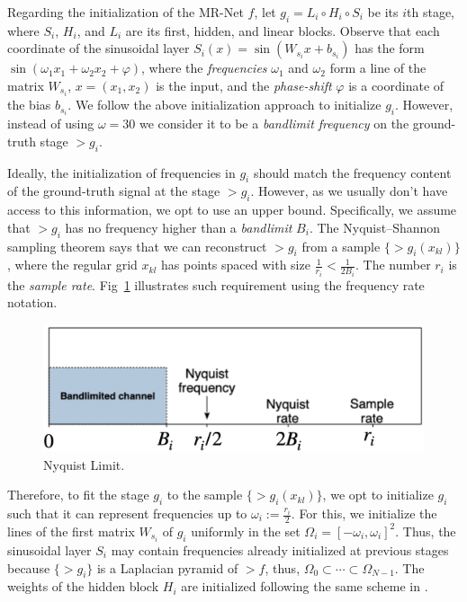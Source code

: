 Regarding the initialization of the MR-Net $f$, let $g_i=L_i\circ H_i\circ S_i$ be its $i$th stage, where $S_i$, $H_i$, and $L_i$ are its first, hidden, and linear blocks.
Observe that each coordinate of the sinusoidal layer $S_i(x)=\sin\left(W_{s_i} x+b_{s_i}\right)$ has the form $\sin(\omega_1 x_1 +\omega_2 x_2 + \varphi)$, where the \textit{frequencies} $\omega_1$ and $\omega_2$ form a line of the matrix $W_{s_i}$, $x=(x_1,x_2)$ is the input, and the \textit{phase-shift} $ \varphi$ is a coordinate of the bias $b_{s_i}$. We follow the above initialization approach to initialize $g_{i}$. However, instead of using $\omega=30$ we consider it to be a \textit{bandlimit frequency} on the ground-truth stage $\gt{g}_i$.


Ideally, the initialization of frequencies in $g_i$ should match the frequency content of the ground-truth signal at the stage $\gt{g}_i$. 
However, as we usually don't have access to this information, we opt to use an upper bound. 
Specifically, we assume that $\gt{g}_i$ has no frequency higher than a \textit{bandlimit} $B_i$. The Nyquist–Shannon sampling theorem says that we can reconstruct $\gt{g}_i$ from a sample $\{\gt{g}_i(x_{kl})\}$, where the regular grid $x_{kl}$ has points spaced with size $\frac{1}{r_i}<\frac{1}{2B_i}$. The number $r_i$ is the \textit{sample rate}. Fig~\ref{f:nyquist} illustrates such requirement using the frequency rate notation.  
\begin{figure}[!h]
\centering
\includegraphics[width=0.7\linewidth]{img/ch4/nyquist.png}
\vspace{-0.3cm}
\caption{Nyquist Limit.}
\label{f:nyquist}
\end{figure}


Therefore, to fit the stage $g_i$ to the sample $\{\gt{g}_i(x_{kl})\}$, we opt to initialize $g_i$ such that it can represent frequencies up to $\omega_i:=\frac{r_i}{2}$.
For this, we initialize the lines of the first matrix $W_{s_i}$ of $g_i$ uniformly in the set $\Omega_i=\left[-\omega_i, \omega_i\right]^2$.
Thus, the sinusoidal layer $S_i$ may contain frequencies already initialized at previous stages because $\{\gt{g}_i\}$ is a Laplacian pyramid of $\gt{f}$, thus, $\Omega_0\subset \cdots \subset \Omega_{N-1}$. The weights of the hidden block $H_i$ are initialized following the same scheme in \cite{sitzmann2019siren}.

